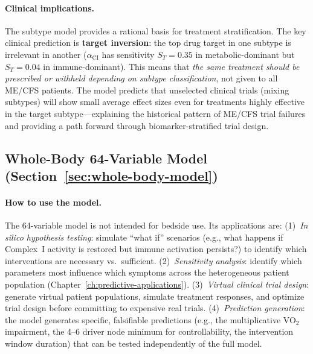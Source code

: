 \paragraph{Clinical implications.}
The subtype model provides a rational basis for treatment stratification. The key clinical prediction is \textbf{target inversion}: the top drug target in one subtype is irrelevant in another ($\alpha_{\text{CI}}$ has sensitivity $S_T = 0.35$ in metabolic-dominant but $S_T = 0.04$ in immune-dominant). This means that \emph{the same treatment should be prescribed or withheld depending on subtype classification}, not given to all ME/CFS patients. The model predicts that unselected clinical trials (mixing subtypes) will show small average effect sizes even for treatments highly effective in the target subtype---explaining the historical pattern of ME/CFS trial failures and providing a path forward through biomarker-stratified trial design.

\subsection{Whole-Body 64-Variable Model (Section~\ref{sec:whole-body-model})}

\paragraph{How to use the model.}
The 64-variable model is not intended for bedside use. Its applications are:
(1)~\emph{In silico hypothesis testing}: simulate ``what if'' scenarios (e.g., what happens if Complex~I activity is restored but immune activation persists?) to identify which interventions are necessary vs.\ sufficient.
(2)~\emph{Sensitivity analysis}: identify which parameters most influence which symptoms across the heterogeneous patient population (Chapter~\ref{ch:predictive-applications}).
(3)~\emph{Virtual clinical trial design}: generate virtual patient populations, simulate treatment responses, and optimize trial design before committing to expensive real trials.
(4)~\emph{Prediction generation}: the model generates specific, falsifiable predictions (e.g., the multiplicative VO$_2$ impairment, the 4--6 driver node minimum for controllability, the intervention window duration) that can be tested independently of the full model.

